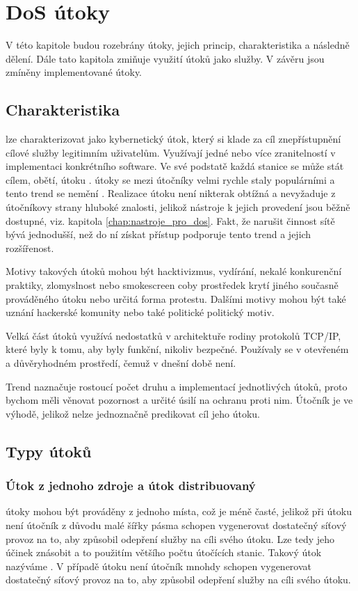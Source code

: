 \chapter[DoS útoky]{DoS útoky}
V této kapitole budou rozebrány  útoky, jejich princip, charakteristika a následně dělení. Dále tato kapitola zmiňuje využití  útoků jako služby. V závěru jsou zmíněny implementované útoky.

\section{Charakteristika}
 lze charakterizovat jako kybernetický útok, který si klade za cíl znepřístupnění cílové služby legitimním uživatelům. Využívají jedné nebo více zranitelností v implementaci konkrétního software. Ve své podstatě každá stanice se může stát cílem, obětí, útoku .  útoky se mezi útočníky velmi rychle staly populárními a tento trend se nemění \cite{akamai_q2_2017}. Realizace  útoku není nikterak obtížná a nevyžaduje z útočníkovy strany hluboké znalosti, jelikož nástroje k jejich provedení jsou běžně dostupné, viz. kapitola \ref{chap:nastroje_pro_dos}. Fakt, že narušit činnost sítě bývá jednodušší, než do ní získat přístup podporuje tento trend a jejich rozšířenost. 

Motivy takových útoků mohou být hacktivizmus, vydírání, nekalé konkurenční praktiky, zlomyslnost nebo smokescreen coby prostředek krytí jiného současně prováděného útoku nebo určitá forma protestu. Dalšími motivy mohou být také uznání hackerské komunity nebo také politické politický motiv.

Velká část útoků využívá nedostatků v architektuře rodiny protokolů TCP/IP, které byly k tomu, aby byly funkční, nikoliv bezpečné. Používaly se v otevřeném a důvěryhodném prostředí, čemuž v dnešní době není.

Trend naznačuje rostoucí počet druhu a implementací jednotlivých útoků, proto bychom měli věnovat pozornost a určité úsilí na ochranu proti nim. Útočník je ve výhodě, jelikož nelze jednoznačně predikovat cíl jeho útoku.


\section{Typy útoků}
\subsection{Útok z jednoho zdroje a útok distribuovaný}
 útoky mohou být prováděny z jednoho místa, což je méně časté, jelikož při  útoku není útočník z důvodu malé šířky pásma schopen vygenerovat dostatečný síťový provoz na to, aby způsobil odepření služby na cíli svého útoku. Lze tedy jeho účinek znásobit a to použitím většího počtu útočících stanic. Takový útok nazýváme . V případě  útoku není útočník mnohdy schopen vygenerovat dostatečný síťový provoz na to, aby způsobil odepření služby na cíli svého útoku.

